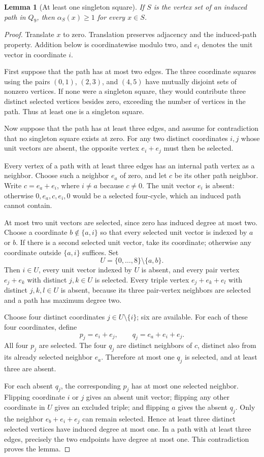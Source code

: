 \documentclass[11pt,a4paper]{article}
\newtheorem{lemma}[theorem]{Lemma}
\theoremstyle{definition}
\theoremstyle{remark}
\newcommand{\Q}{Q}
\begin{document}
\begin{lemma}[At least one singleton square]\label{lem:one-square}
If $S$ is the vertex set of an induced path in $\Q_9$, then $\alpha_S(x)\ge1$ for every $x\in S$.
\end{lemma}
\begin{proof}
Translate $x$ to zero. Translation preserves adjacency and the induced-path property. Addition below is coordinatewise modulo two, and $e_i$ denotes the unit vector in coordinate $i$.

First suppose that the path has at most two edges. The three coordinate squares using the pairs $(0,1)$, $(2,3)$, and $(4,5)$ have mutually disjoint sets of nonzero vertices. If none were a singleton square, they would contribute three distinct selected vertices besides zero, exceeding the number of vertices in the path. Thus at least one is a singleton square.

Now suppose that the path has at least three edges, and assume for contradiction that no singleton square exists at zero. For any two distinct coordinates $i,j$ whose unit vectors are absent, the opposite vertex $e_i+e_j$ must then be selected.

Every vertex of a path with at least three edges has an internal path vertex as a neighbor. Choose such a neighbor $e_a$ of zero, and let $c$ be its other path neighbor. Write $c=e_a+e_i$, where $i\ne a$ because $c\ne0$. The unit vector $e_i$ is absent: otherwise $0,e_a,c,e_i,0$ would be a selected four-cycle, which an induced path cannot contain.

At most two unit vectors are selected, since zero has induced degree at most two. Choose a coordinate $b\notin\{a,i\}$ so that every selected unit vector is indexed by $a$ or $b$. If there is a second selected unit vector, take its coordinate; otherwise any coordinate outside $\{a,i\}$ suffices. Set
\[
U=\{0,\ldots,8\}\setminus\{a,b\}.
\]
Then $i\in U$, every unit vector indexed by $U$ is absent, and every pair vertex $e_j+e_k$ with distinct $j,k\in U$ is selected. Every triple vertex $e_j+e_k+e_l$ with distinct $j,k,l\in U$ is absent, because its three pair-vertex neighbors are selected and a path has maximum degree two.

Choose four distinct coordinates $j\in U\setminus\{i\}$; six are available. For each of these four coordinates, define
\[
p_j=e_i+e_j,\qquad q_j=e_a+e_i+e_j.
\]
All four $p_j$ are selected. The four $q_j$ are distinct neighbors of $c$, distinct also from its already selected neighbor $e_a$. Therefore at most one $q_j$ is selected, and at least three are absent.

For each absent $q_j$, the corresponding $p_j$ has at most one selected neighbor. Flipping coordinate $i$ or $j$ gives an absent unit vector; flipping any other coordinate in $U$ gives an excluded triple; and flipping $a$ gives the absent $q_j$. Only the neighbor $e_b+e_i+e_j$ can remain selected. Hence at least three distinct selected vertices have induced degree at most one. In a path with at least three edges, precisely the two endpoints have degree at most one. This contradiction proves the lemma.
\end{proof}
\end{document}
